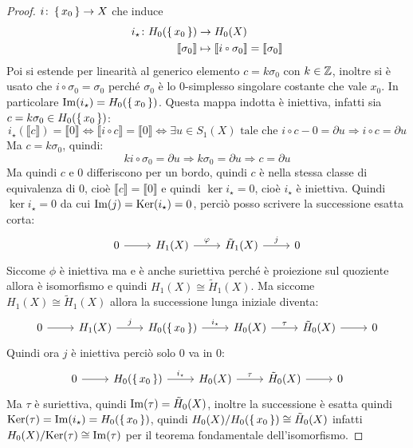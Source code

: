 \begin{proof}
  $ i \colon \set{x_0} \to X $ che induce
  \begin{align*}
    i_\star \colon H_0(\set{x_0}) & \to H_0(X) \\
    \llbracket\sigma_0\rrbracket & \mapsto \llbracket i \circ \sigma_0 \rrbracket = \llbracket \sigma_0 \rrbracket
  \end{align*}
  Poi si estende per linearità al generico elemento $ c = k \sigma_0 $ con $ k \in \mathbb{Z} $, inoltre
  si è usato che $ i \circ \sigma_0 = \sigma_0 $ perché $ \sigma_0 $ è lo $ 0 $-simplesso singolare
  costante che vale $ x_0 $. In particolare $ \mathrm{Im}( i_\star ) = H_0(\set{x_0}) $.
  Questa mappa indotta è iniettiva, infatti sia  $ c = k \sigma_0 \in H_0(\set{x_0}) $:
  \[
    i_\star(\llbracket c \rrbracket) = \llbracket 0 \rrbracket \iff \llbracket i \circ c \rrbracket = \llbracket 0 \rrbracket \iff \exists u \in S_1(X) \text{ tale che } i \circ c - 0 = \partial u \Rightarrow i \circ c = \partial u
  \]
  Ma $ c = k \sigma_0 $, quindi:
  \[
    k i \circ \sigma_0 = \partial u \Rightarrow k \sigma_0 = \partial u \Rightarrow c = \partial u
  \]
  Ma quindi $ c $ e $ 0 $ differiscono per un bordo, quindi $ c $ è nella stessa classe
  di equivalenza di $ 0 $, cioè $ \llbracket c \rrbracket = \llbracket 0 \rrbracket $ e quindi $ \ker{i_\star} = 0 $, cioè $ i_\star $ è
  iniettiva.
  Quindi $ \ker{i_\star} = 0 $ da cui $ \mathrm{Im}( j ) = \mathrm{Ker}( i_\star) = 0 $, perciò posso scrivere
  la successione esatta corta:
  \[
    \begin{tikzcd}
      0 \rar & H_1(X) \rar{\phi} & \tilde{H}_1(X) \rar{j} & 0
    \end{tikzcd}
  \]
  Siccome $ \phi $ è iniettiva ma e è anche suriettiva perché è proiezione
  sul quoziente allora è isomorfismo e quindi $ H_1(X) \cong \tilde{H}_1(X) $.
  Ma siccome $ H_1(X) \cong \tilde{H}_1(X) $ allora la successione lunga iniziale diventa:
  \[
    \begin{tikzcd}
      0 \rar & H_1(X) \arrow{r}{j} & H_0(\set{x_0}) \arrow{r}{i_\star} &  H_0(X) \arrow{r}{\tau} & \tilde{H}_0(X) \arrow{r}{} & 0
    \end{tikzcd}
  \]
  Quindi ora $ j $ è iniettiva perciò solo $ 0 $ va in $ 0 $:
  \[
    \begin{tikzcd}
      0 \rar & H_0(\set{x_0}) \arrow{r}{i_\star} &  H_0(X) \arrow{r}{\tau} & \tilde{H}_0(X) \arrow{r}{} & 0
    \end{tikzcd}
  \]
  Ma $ \tau $ è suriettiva, quindi $ \mathrm{Im}( \tau ) = \tilde{H}_0(X) $, inoltre la
  successione è esatta quindi $ \mathrm{Ker}( \tau) = \mathrm{Im}( i_\star ) = H_0(\set{x_0}) $, quindi
  $ {H_0(X)} \slash {H_0(\set{x_0})} \cong \tilde{H}_0(X) $ infatti
  $ {H_0(X)} \slash {\mathrm{Ker}( \tau)} \cong \mathrm{Im}( \tau ) $ per il teorema fondamentale
  dell'isomorfismo.


\end{proof}
